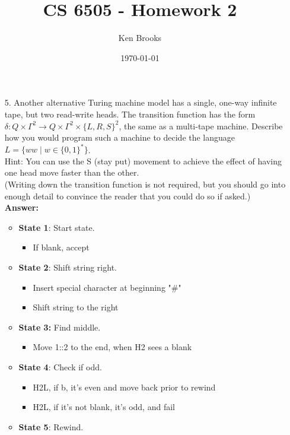\documentclass[12pt]{amsart}
\title{CS 6505 - Homework 2}
\author{Ken Brooks}
\date{\today}
\begin{document}
\maketitle

\begin{itemize}
\item[{\rm 5.}] Another alternative Turing machine model has a single, one-way infinite tape, but two read-write heads.  The transition function has the form $\delta:Q\times\Gamma^{2}\rightarrow Q\times\Gamma^{2}\times\{L,R,S\}^{2}$, the same as a multi-tape machine.  Describe how you would program such a machine to decide the language $L=\{ww \mid w \in\{0,1\}^{*}\}$. 
\\[.2in]Hint: You can use the S (stay put) movement to achieve the effect of having one head move faster than the other. 
\\[.2in](Writing down the transition function is not required, but you should go into enough detail to convince the reader that you could do so if asked.)
\\[.2in]\textbf{Answer:}
\vspace{.2in}
\begin{itemize}
\item \textbf{State 1}: Start state. 
\begin{itemize}
\item If blank, accept
\end{itemize}
\item \textbf{State 2}: Shift string right. 
\begin{itemize}
\item Insert special character at beginning "\#"
\item Shift string to the right
\end{itemize}
\item \textbf{State 3:} Find middle.
\begin{itemize}
\item Move 1::2 to the end, when H2 sees a blank
\end{itemize}
\item \textbf{State 4}: Check if odd.
\begin{itemize}
\item  H2L, if b, it's even and move back prior to rewind
\item  H2L, if it's not blank, it's odd, and fail
\end{itemize}
\item \textbf{State 5}: Rewind.
\begin{itemize}

\end{itemize}
\end{itemize}
\end{itemize}
\end{document}

